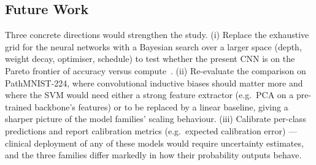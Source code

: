 \documentclass[../main.tex]{subfiles}
\begin{document}
\subsection{Future Work}
\noindent
Three concrete directions would strengthen the study. (i) Replace the
exhaustive grid for the neural networks with a Bayesian search over a
larger space (depth, weight decay, optimiser, schedule) to test whether
the present \gls{CNN} is on the Pareto frontier of accuracy versus
compute~\cite{bergstra2012random}. (ii) Re-evaluate the comparison on
PathMNIST-224, where convolutional inductive biases should matter more
and where the \gls{SVM} would need either a strong feature extractor
(e.g.~\gls{PCA} on a pre-trained backbone's features) or to be replaced
by a linear baseline, giving a sharper picture of the model
families' scaling behaviour. (iii) Calibrate per-class predictions and
report calibration metrics (e.g.~expected calibration error) — clinical
deployment of any of these models would require uncertainty estimates,
and the three families differ markedly in how their probability outputs
behave.
\end{document}
